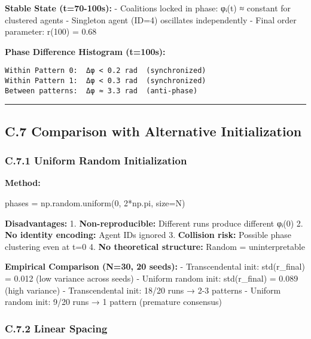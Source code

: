 \documentclass[
]{article}
\newenvironment{Shaded}{}{}
\newcommand{\DecValTok}[1]{\textcolor[rgb]{0.25,0.63,0.44}{#1}}
\newcommand{\NormalTok}[1]{#1}
\newcommand{\OperatorTok}[1]{\textcolor[rgb]{0.40,0.40,0.40}{#1}}
\begin{document}
\textbf{Stable State (t=70-100s):} - Coalitions locked in phase: φᵢ(t) ≈
constant for clustered agents - Singleton agent (ID=4) oscillates
independently - Final order parameter: r(100) = 0.68

\textbf{Phase Difference Histogram (t=100s):}

\begin{verbatim}
Within Pattern 0:  Δφ < 0.2 rad  (synchronized)
Within Pattern 1:  Δφ < 0.3 rad  (synchronized)
Between patterns:  Δφ ≈ 3.3 rad  (anti-phase)
\end{verbatim}

\begin{center}\rule{0.5\linewidth}{0.5pt}\end{center}

\subsection{C.7 Comparison with Alternative
Initialization}\label{c.7-comparison-with-alternative-initialization}

\subsubsection{C.7.1 Uniform Random
Initialization}\label{c.7.1-uniform-random-initialization}

\textbf{Method:}

\begin{Shaded}
\begin{Highlighting}[]
\NormalTok{phases }\OperatorTok{=}\NormalTok{ np.random.uniform(}\DecValTok{0}\NormalTok{, }\DecValTok{2}\OperatorTok{*}\NormalTok{np.pi, size}\OperatorTok{=}\NormalTok{N)}
\end{Highlighting}
\end{Shaded}

\textbf{Disadvantages:} 1. \textbf{Non-reproducible:} Different runs
produce different φᵢ(0) 2. \textbf{No identity encoding:} Agent IDs
ignored 3. \textbf{Collision risk:} Possible phase clustering even at
t=0 4. \textbf{No theoretical structure:} Random = uninterpretable

\textbf{Empirical Comparison (N=30, 20 seeds):} - Transcendental init:
std(r\_final) = 0.012 (low variance across seeds) - Uniform random init:
std(r\_final) = 0.089 (high variance) - Transcendental init: 18/20 runs
→ 2-3 patterns - Uniform random init: 9/20 runs → 1 pattern (premature
consensus)

\subsubsection{C.7.2 Linear Spacing}\label{c.7.2-linear-spacing}
\end{document}
